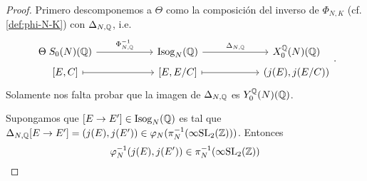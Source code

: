 \documentclass[../../tesis_maestria]{subfiles}
\begin{document}
\begin{proof}

Primero descomponemos a $\Theta$ como la composición del inverso de $\Phi_{N,K}$ (cf. \eqref{def:phi-N-K}) con $\Delta_{N,\mathbb{Q}}$, i.e.
\[
	\begin{tikzcd}[row sep=1mm,column sep=20mm]
		\Theta\; S_0(N)(\QQ) \arrow[r,"\Phi^{-1}_{N,\QQ}"] & \mathrm{Isog}_N(\QQ) \arrow[r,"\Delta_{N,\QQ}"] & X^\QQ_0(N)(\QQ) \\
		\text{[}E,C\text{]} \arrow[r,mapsto] & \text{[}E,E/C\text{]} \arrow[r,mapsto] & (j(E),j(E/C))
	\end{tikzcd}.
\]
Solamente nos falta probar que la imagen de $\Delta_{N,\mathbb{Q}}$ es $Y^{\mathbb{Q}}_0(N)(\mathbb{Q})$.

Supongamos que $[E\rightarrow E']\in\mathrm{Isog}_N(\mathbb{Q})$ es tal que $\Delta_{N,\mathbb{Q}}[E\rightarrow E']=(j(E),j(E'))\in\varphi_N(\pi_N^{-1}(\infty\mathrm{SL}_2(\mathbb{Z})))$. Entonces
\[
	\varphi_N^{-1}(j(E),j(E'))\in\pi_N^{-1}(\infty\mathrm{SL}_2(\mathbb{Z}))
\]
\end{proof}
\end{document}
